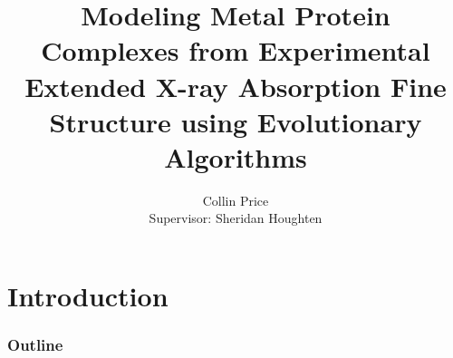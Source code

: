 \documentclass[10pt]{beamer}
\begin{document}
\title[Modeling OEC using EXAFS]{Modeling Metal Protein Complexes from Experimental Extended X-ray Absorption Fine Structure using Evolutionary Algorithms}

\author[Price]{
	Collin Price
	\\
	{\small Supervisor: Sheridan Houghten}
}


\begin{frame}
	\titlepage
\end{frame}

\section{Introduction}

\begin{frame}
	\frametitle{Outline}
	\tableofcontents
\end{frame}
\end{document}
